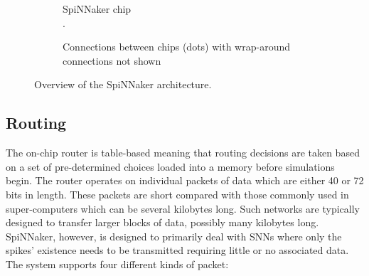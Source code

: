 			\begin{figure}
				\center
				\begin{subfigure}[b]{0.49\textwidth}
					\center
					
					\caption{SpiNNaker chip\\\color{white}.}
					\label{fig:spinnaker-chip}
				\end{subfigure}
				\begin{subfigure}[b]{0.49\textwidth}
					\center
					
					\caption{Connections between chips (dots) with wrap-around
					connections not shown}
					\label{fig:spinnaker-chips}
				\end{subfigure}
				
				\caption{Overview of the SpiNNaker architecture.}
				\label{fig:spinnaker-architecture}
			\end{figure}
		
		\subsection{Routing}
			
			
			The on-chip router is table-based meaning that routing decisions are taken
			based on a set of pre-determined choices loaded into a memory before
			simulations begin. The router operates on individual packets of data which
			are either 40 or 72 bits in length. These packets are short compared
			with those commonly used in super-computers which can be several kilobytes
			long.  Such networks are typically designed to transfer larger blocks of
			data, possibly many kilobytes long. SpiNNaker, however, is designed to
			primarily deal with SNNs where only the spikes' existence needs to be
			transmitted requiring little or no associated data.  The system supports
			four different kinds of packet:
			
